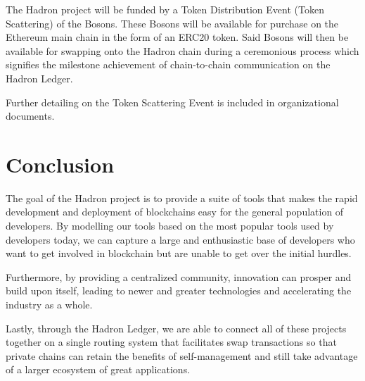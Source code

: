 \documentclass{%
	article}
\begin{document}
The Hadron project will be funded by a Token Distribution Event (Token Scattering) of the Bosons. These Bosons will be available for purchase on the Ethereum main chain in the form of an ERC20 token. Said Bosons will then be available for swapping onto the Hadron chain during a ceremonious process which signifies the milestone achievement of chain-to-chain communication on the Hadron Ledger.

Further detailing on the Token Scattering Event is included in organizational documents.

\section{Conclusion}

The goal of the Hadron project is to provide a suite of tools that makes the rapid development and deployment of blockchains easy for the general population of developers. By modelling our tools based on the most popular tools used by developers today, we can capture a large and enthusiastic base of developers who want to get involved in blockchain but are unable to get over the initial hurdles.

Furthermore, by providing a centralized community, innovation can prosper and build upon itself, leading to newer and greater technologies and accelerating the industry as a whole.

Lastly, through the Hadron Ledger, we are able to connect all of these projects together on a single routing system that facilitates swap transactions so that private chains can retain the benefits of self-management and still take advantage of a larger ecosystem of great applications.


{}

\end{document}
